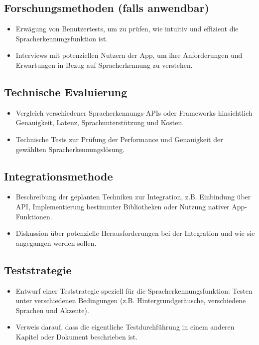\documentclass[11pt,a4paper]{article}
\begin{document}
\subsection{Forschungsmethoden (falls anwendbar)}
\begin{itemize}
	\item Erwägung von Benutzertests, um zu prüfen, wie intuitiv und effizient die Spracherkennungsfunktion ist.
	\item Interviews mit potenziellen Nutzern der App, um ihre Anforderungen und Erwartungen in Bezug auf Spracherkennung zu verstehen.
\end{itemize}

\subsection{Technische Evaluierung}
\begin{itemize}
	\item Vergleich verschiedener Spracherkennungs-APIs oder Frameworks hinsichtlich Genauigkeit, Latenz, Sprachunterstützung und Kosten.
	\item Technische Tests zur Prüfung der Performance und Genauigkeit der gewählten Spracherkennungslösung.
\end{itemize}

\subsection{Integrationsmethode}
\begin{itemize}
	\item Beschreibung der geplanten Techniken zur Integration, z.B. Einbindung über API, Implementierung bestimmter Bibliotheken oder Nutzung nativer App-Funktionen.
	\item Diskussion über potenzielle Herausforderungen bei der Integration und wie sie angegangen werden sollen.
\end{itemize}

\subsection{Teststrategie}
\begin{itemize}
	\item Entwurf einer Teststrategie speziell für die Spracherkennungsfunktion: Testen unter verschiedenen Bedingungen (z.B. Hintergrundgeräusche, verschiedene Sprachen und Akzente).
	\item Verweis darauf, dass die eigentliche Testdurchführung in einem anderen Kapitel oder Dokument beschrieben ist.
\end{itemize}
\end{document}
